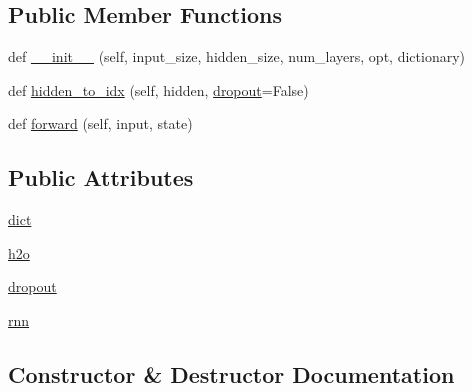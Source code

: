 \subsection*{Public Member Functions}
\begin{DoxyCompactItemize}
\item 
def \hyperlink{classparlai_1_1agents_1_1legacy__agents_1_1memnn_1_1modules__v0_1_1Decoder_ad1d510abd06254aa12ec3f9cc61bb612}{\+\_\+\+\_\+init\+\_\+\+\_\+} (self, input\+\_\+size, hidden\+\_\+size, num\+\_\+layers, opt, dictionary)
\item 
def \hyperlink{classparlai_1_1agents_1_1legacy__agents_1_1memnn_1_1modules__v0_1_1Decoder_aafa684988d164a4ec2cfdb141e1ea31e}{hidden\+\_\+to\+\_\+idx} (self, hidden, \hyperlink{classparlai_1_1agents_1_1legacy__agents_1_1memnn_1_1modules__v0_1_1Decoder_a0116a3c2b822fd074e7f67efc3609b69}{dropout}=False)
\item 
def \hyperlink{classparlai_1_1agents_1_1legacy__agents_1_1memnn_1_1modules__v0_1_1Decoder_a1da4529bbaf122064ff7109fd88cd12a}{forward} (self, input, state)
\end{DoxyCompactItemize}
\subsection*{Public Attributes}
\begin{DoxyCompactItemize}
\item 
\hyperlink{classparlai_1_1agents_1_1legacy__agents_1_1memnn_1_1modules__v0_1_1Decoder_a612b3cfacbcdef8db8a7c6adc45e6695}{dict}
\item 
\hyperlink{classparlai_1_1agents_1_1legacy__agents_1_1memnn_1_1modules__v0_1_1Decoder_add594d5a2a241288c95a899b640b6aca}{h2o}
\item 
\hyperlink{classparlai_1_1agents_1_1legacy__agents_1_1memnn_1_1modules__v0_1_1Decoder_a0116a3c2b822fd074e7f67efc3609b69}{dropout}
\item 
\hyperlink{classparlai_1_1agents_1_1legacy__agents_1_1memnn_1_1modules__v0_1_1Decoder_aa5c0e1fd441c2c00358fa1fc64e86013}{rnn}
\end{DoxyCompactItemize}


\subsection{Constructor \& Destructor Documentation}
\mbox{\label{classparlai_1_1agents_1_1legacy__agents_1_1memnn_1_1modules__v0_1_1Decoder_ad1d510abd06254aa12ec3f9cc61bb612}} 
